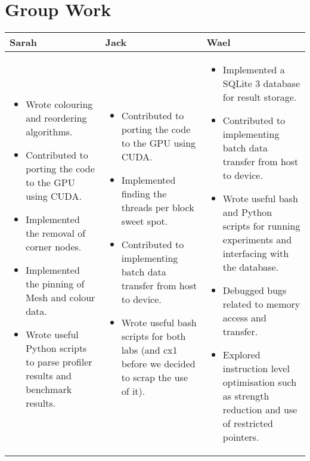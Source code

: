 \section{Group Work}
\begin{tabular}{|p{5.5cm}| p{5.5cm} | p{5.5cm} |}
  \hline
  Sarah & Jack & Wael\\
  \hline
  \hline
  \begin{itemize}
    \item Wrote colouring and reordering algorithms.
    \item Contributed to porting the code to the GPU using CUDA.
    \item Implemented the removal of corner nodes.
    \item Implemented the pinning of Mesh and colour data.
    \item Wrote useful Python scripts to parse profiler results and benchmark results.
  \end{itemize} &

  \begin{itemize}
    \item Contributed to porting the code to the GPU using CUDA.
    \item Implemented finding the threads per block sweet spot.
    \item Contributed to implementing batch data transfer from host to device.
    \item Wrote useful bash scripts for both labs (and cx1 before we decided to scrap the use of it).
  \end{itemize} &

  \begin{itemize}
    \item Implemented a SQLite 3 database for result storage.
    \item Contributed to implementing batch data transfer from host to device.
    \item Wrote useful bash and Python scripts for running experiments and interfacing with the database.
    \item Debugged bugs related to memory access and transfer.
    \item Explored instruction level optimisation such as strength reduction and use of restricted pointers.
  \end{itemize} \\
  \hline
\end{tabular}
